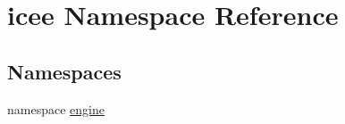 \hypertarget{namespaceicee}{
\section{icee Namespace Reference}
\label{namespaceicee}
}
\subsection*{Namespaces}
\begin{DoxyCompactItemize}
\item 
namespace \hyperlink{namespaceicee_1_1engine}{engine}
\end{DoxyCompactItemize}
